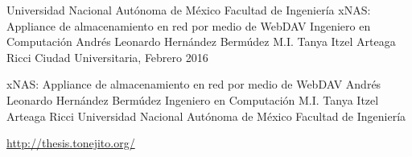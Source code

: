 \documentclass[dvips,letterpaper,12pt,twoside,spanish,headsepline,headinclude]{report}
\begin{document}


{
\pagestyle{empty}
\thesistitle
	{Universidad Nacional Aut\'{o}noma de M\'{e}xico}
	{Facultad de Ingenier\'{i}a}
	{xNAS: Appliance de almacenamiento en red por medio de WebDAV}
	{Ingeniero en Computaci\'{o}n}
	{Andr\'{e}s Leonardo Hern\'{a}ndez Berm\'{u}dez}
	{M.I. Tanya Itzel Arteaga Ricci}
	{Ciudad Universitaria, Febrero 2016}

\thesispdfinfo
	{xNAS: Appliance de almacenamiento en red por medio de WebDAV}
	{Andr\'{e}s Leonardo Hern\'{a}ndez Berm\'{u}dez}
	{Ingeniero en Computaci\'{o}n}
	{M.I. Tanya Itzel Arteaga Ricci}
	{Universidad Nacional Aut\'{o}noma de M\'{e}xico}
	{Facultad de Ingenier\'{i}a}

 
 
 
%	
 
 
}

{
\pagestyle{headings}






\appendix

}
{
{}  
\label{chap:glossary}
\printglossary[title=Glosario,toctitle=Glosario]
}
{

}
{
\newpage\null\thispagestyle{empty}\newpage
}
{
\thispagestyle{empty}
\clearpage
 \vspace*{\fill}
  \begin{center}
   \url{http://thesis.tonejito.org/}
  \end{center}
 \vfill %
\clearpage
}
\end{document}
